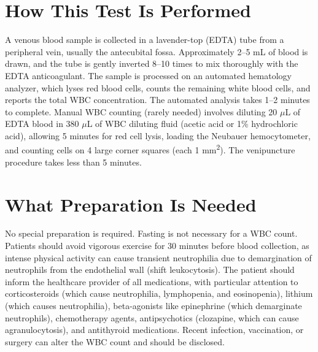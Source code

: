 \section*{How This Test Is Performed}
A venous blood sample is collected in a lavender-top (EDTA) tube from a peripheral vein, usually the antecubital fossa. Approximately 2--5 mL of blood is drawn, and the tube is gently inverted 8--10 times to mix thoroughly with the EDTA anticoagulant. The sample is processed on an automated hematology analyzer, which lyses red blood cells, counts the remaining white blood cells, and reports the total WBC concentration. The automated analysis takes 1--2 minutes to complete. Manual WBC counting (rarely needed) involves diluting 20 $\mu$L of EDTA blood in 380 $\mu$L of WBC diluting fluid (acetic acid or 1\% hydrochloric acid), allowing 5 minutes for red cell lysis, loading the Neubauer hemocytometer, and counting cells on 4 large corner squares (each 1 mm\textsuperscript{2}). The venipuncture procedure takes less than 5 minutes.

\section*{What Preparation Is Needed}
No special preparation is required. Fasting is not necessary for a WBC count. Patients should avoid vigorous exercise for 30 minutes before blood collection, as intense physical activity can cause transient neutrophilia due to demargination of neutrophils from the endothelial wall (shift leukocytosis). The patient should inform the healthcare provider of all medications, with particular attention to corticosteroids (which cause neutrophilia, lymphopenia, and eosinopenia), lithium (which causes neutrophilia), beta-agonists like epinephrine (which demarginate neutrophils), chemotherapy agents, antipsychotics (clozapine, which can cause agranulocytosis), and antithyroid medications. Recent infection, vaccination, or surgery can alter the WBC count and should be disclosed.

